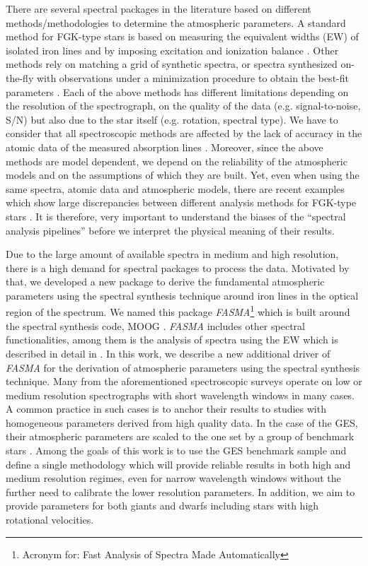 \documentclass[fleqn,usenatbib]{mnras}
\begin{document}
There are several spectral packages in the literature based on different methods/methodologies {to determine} the atmospheric parameters. 
A standard method for FGK-type stars is based on measuring the equivalent widths (EW) of isolated iron lines and by imposing excitation and ionization balance 
\citep[e.g.][]{magrini2013, Mucciarelli2013, Tabernero2013, sousa2014, Andreasen2017}. 
Other methods rely on matching a grid of synthetic spectra, or spectra synthesized on-the-fly with observations 
under a minimization procedure to obtain the best-fit parameters \citep[e.g.][]{valenti96, recio06, allende2006, Lee2008, blanco2014a}.
Each of the above methods has different limitations depending on the resolution of the spectrograph, on the quality of the data (e.g. signal-to-noise, S/N) but also due to the star itself 
(e.g. rotation, spectral type). We have to consider that all spectroscopic methods are affected by the lack of accuracy in the atomic data of the measured absorption lines 
\citep[e.g.][]{Borrero2002}. Moreover, since the above methods are model dependent, we depend on the reliability of the atmospheric models and on the assumptions of which they are built. 
 Yet, even when using the same spectra, atomic data and atmospheric models, there are recent examples which show large discrepancies between different analysis methods for FGK-type stars 
\citep[e.g.][]{jofre2014, Smiljanic2014, Hinkel2016,jofre2017}. It is therefore, very important to understand the biases of the ``spectral analysis pipelines'' before we interpret the physical 
meaning of their results.

Due to the large amount of available spectra in medium and high resolution, there is a high demand for spectral packages to process the data. 
Motivated by that, 
we developed a new package to derive the fundamental atmospheric parameters using the spectral synthesis technique around iron lines in the optical region of the spectrum. 
We named this package \textit{FASMA}\footnote{Acronym for: Fast Analysis of Spectra Made Automatically} which is built around the spectral synthesis code, MOOG \citep{sneden1973}. 
\textit{FASMA} includes other spectral functionalities, among them is the analysis of spectra using the EW which is described in detail in \cite{Andreasen2017}. In this work, we describe a new 
additional driver of \textit{FASMA} for the derivation of atmospheric parameters using the spectral synthesis technique. 
Many from the aforementioned spectroscopic surveys operate on low or medium resolution spectrographs with short wavelength windows in many cases. 
A common practice in such cases is to anchor their results to studies with homogeneous parameters derived from high quality data. 
In the case of the GES, their atmospheric parameters are scaled to the one set by a group of benchmark stars \citep{Heiter2015}. Among the goals of this work is to use the 
GES benchmark sample and define a single methodology which will provide reliable results in both high and medium resolution regimes, even for narrow wavelength windows without the further 
need to calibrate the lower resolution parameters. In addition, we aim to provide parameters for both giants and dwarfs including stars with high rotational velocities. 
\end{document}

